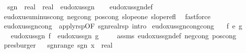 \begin{isabellebody}
\isanewline
{}\isamarkupfalse%
\isanewline
\ \ {\isachardoublequoteopen}{\isacharparenleft}{\kern0pt}sgn\ {\isacharcolon}{\kern0pt}{\isacharcolon}{\kern0pt}\ real\ {\isasymRightarrow}\ real{\isacharparenright}{\kern0pt}{\isachardoublequoteclose}\ \ eudoxus{\isacharunderscore}{\kern0pt}sgn\isanewline
%
\isadelimproof
\ \ %
\endisadelimproof
%
\isatagproof
{}\isamarkupfalse%
\ eudoxus{\isacharunderscore}{\kern0pt}sgn{\isacharunderscore}{\kern0pt}def\isanewline
\ \ \isamarkupfalse%
\ eudoxus{\isacharunderscore}{\kern0pt}uminus{\isacharunderscore}{\kern0pt}cong\ neg{\isacharunderscore}{\kern0pt}cong\ pos{\isacharunderscore}{\kern0pt}cong\ slope{\isacharunderscore}{\kern0pt}one\ slope{\isacharunderscore}{\kern0pt}refl\ \isamarkupfalse%
\ fastforce%
\endisatagproof
{\isafoldproof}%
%
\isadelimproof
\isanewline
%
\endisadelimproof
\isanewline
{}\isamarkupfalse%
\ eudoxus{\isacharunderscore}{\kern0pt}sgn{\isacharunderscore}{\kern0pt}cong\ {\isacharequal}{\kern0pt}\ apply{\isacharunderscore}{\kern0pt}rsp{\isacharprime}{\kern0pt}{\isacharbrackleft}{\kern0pt}OF\ sgn{\isacharunderscore}{\kern0pt}real{\isachardot}{\kern0pt}rsp{\isacharcomma}{\kern0pt}\ intro{\isacharbrackright}{\kern0pt}\isanewline
\isanewline
{}\isamarkupfalse%
\ eudoxus{\isacharunderscore}{\kern0pt}sgn{\isacharunderscore}{\kern0pt}cong{\isacharprime}{\kern0pt}{\isacharbrackleft}{\kern0pt}cong{\isacharbrackright}{\kern0pt}{\isacharcolon}{\kern0pt}\isanewline
\ \ \ {\isachardoublequoteopen}f\ {\isasymsim}\isactrlsub e\ g{\isachardoublequoteclose}\isanewline
\ \ \ {\isachardoublequoteopen}eudoxus{\isacharunderscore}{\kern0pt}sgn\ f\ {\isacharequal}{\kern0pt}\ eudoxus{\isacharunderscore}{\kern0pt}sgn\ g{\isachardoublequoteclose}\ \isanewline
%
\isadelimproof
\ \ %
\endisadelimproof
%
\isatagproof
{}\isamarkupfalse%
\ assms\ eudoxus{\isacharunderscore}{\kern0pt}sgn{\isacharunderscore}{\kern0pt}def\ neg{\isacharunderscore}{\kern0pt}cong\ pos{\isacharunderscore}{\kern0pt}cong\ \isamarkupfalse%
\ presburger%
\endisatagproof
{\isafoldproof}%
%
\isadelimproof
\ \isanewline
%
\endisadelimproof
\isanewline
{}\isamarkupfalse%
\ sgn{\isacharunderscore}{\kern0pt}range{\isacharcolon}{\kern0pt}\ {\isachardoublequoteopen}sgn\ {\isacharparenleft}{\kern0pt}x\ {\isacharcolon}{\kern0pt}{\isacharcolon}{\kern0pt}\ real{\isacharparenright}{\kern0pt}\ {\isasymin}\ {\isacharbraceleft}{\kern0pt}{\isacharminus}{\kern0pt}{}{\isacharcomma}{\kern0pt}\ {}{\isacharcomma}{\kern0pt}\ {}{\isacharbraceright}{\kern0pt}{\isachardoublequoteclose}%

\end{isabellebody}
